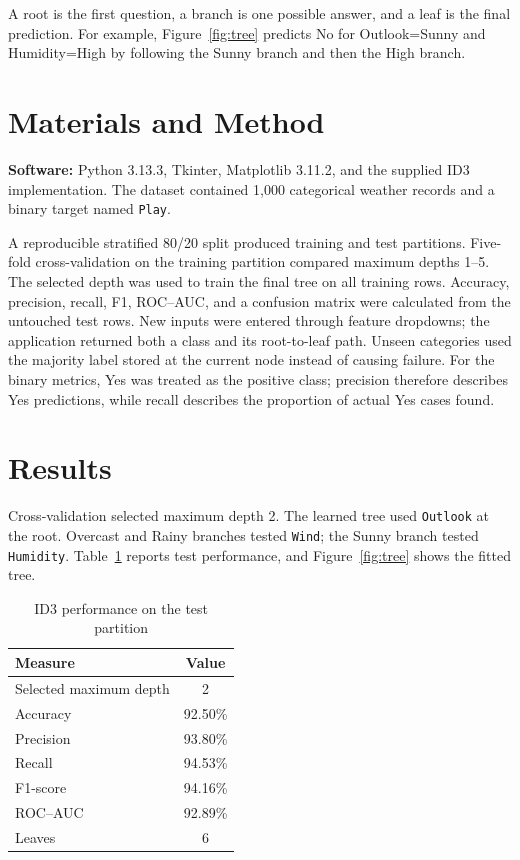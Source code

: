 \documentclass[12pt,a4paper]{report}
\begin{document}
A root is the first question, a branch is one possible answer, and a leaf is the final prediction. For example, Figure~\ref{fig:tree} predicts No for Outlook=Sunny and Humidity=High by following the Sunny branch and then the High branch.

\section{Materials and Method}
\textbf{Software:} Python 3.13.3, Tkinter, Matplotlib 3.11.2, and the supplied ID3 implementation. The dataset contained 1,000 categorical weather records and a binary target named \texttt{Play}.

A reproducible stratified 80/20 split produced training and test partitions. Five-fold cross-validation on the training partition compared maximum depths 1--5. The selected depth was used to train the final tree on all training rows. Accuracy, precision, recall, F1, ROC--AUC, and a confusion matrix were calculated from the untouched test rows. New inputs were entered through feature dropdowns; the application returned both a class and its root-to-leaf path. Unseen categories used the majority label stored at the current node instead of causing failure. For the binary metrics, Yes was treated as the positive class; precision therefore describes Yes predictions, while recall describes the proportion of actual Yes cases found.

\section{Results}
Cross-validation selected maximum depth 2. The learned tree used \texttt{Outlook} at the root. Overcast and Rainy branches tested \texttt{Wind}; the Sunny branch tested \texttt{Humidity}. Table~\ref{tab:dtmetrics} reports test performance, and Figure~\ref{fig:tree} shows the fitted tree.

\begin{table}[H]\centering
\caption{ID3 performance on the test partition}\label{tab:dtmetrics}
\begin{tabular}{lc}\toprule
Measure&Value\\\midrule
Selected maximum depth&2\\
Accuracy&92.50\%\\
Precision&93.80\%\\
Recall&94.53\%\\
F1-score&94.16\%\\
ROC--AUC&92.89\%\\
Leaves&6\\\bottomrule
\end{tabular}\end{table}
\end{document}
